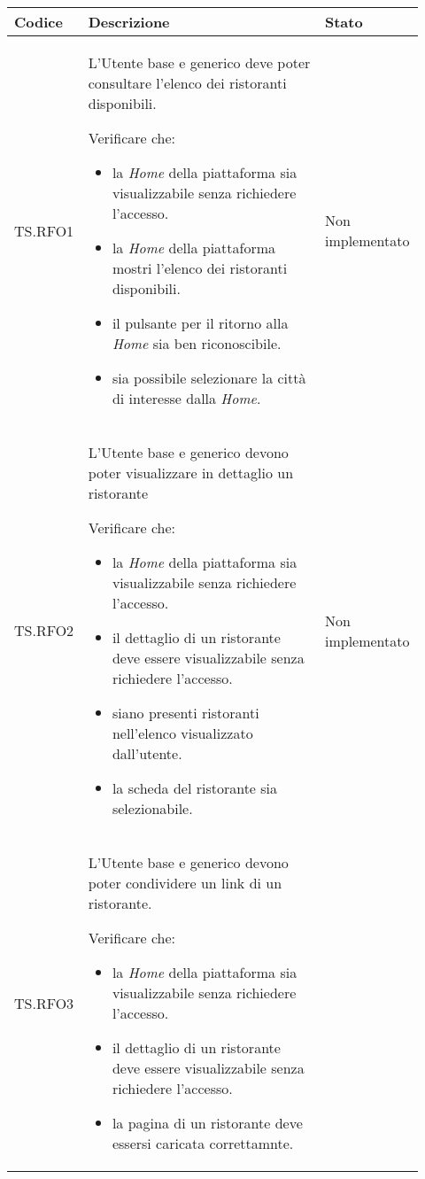 \fontsize{10}{12}\selectfont
\begin{longtable}{|p{0.12\linewidth}|p{0.58\linewidth}|p{0.22\linewidth}|}
    \hline
	\textbf{Codice} & \textbf{Descrizione} & \textbf{Stato} \\
    \hline
    TS.RFO1 & 
    L'Utente base e generico deve poter consultare l'elenco dei ristoranti disponibili. \par 
    Verificare che: 
    \begin{itemize}
        \item la \textit{Home} della piattaforma sia visualizzabile senza richiedere l'accesso.
        \item la \textit{Home} della piattaforma mostri l'elenco dei ristoranti disponibili.
        \item il pulsante per il ritorno alla \textit{Home} sia ben riconoscibile.
        \item sia possibile selezionare la città di interesse dalla \textit{Home}.
    \end{itemize}&
    Non implementato \\
    \hline
    TS.RFO2 & 
    L'Utente base e generico devono poter visualizzare in dettaglio un ristorante \par 
    Verificare che: 
    \begin{itemize}
        \item la \textit{Home} della piattaforma sia visualizzabile senza richiedere l'accesso.
        \item il dettaglio di un ristorante deve essere visualizzabile senza richiedere l'accesso.
        \item siano presenti ristoranti nell'elenco visualizzato dall'utente.
        \item la scheda del ristorante sia selezionabile.
    \end{itemize}&
    Non implementato \\
    \hline
    TS.RFO3 & 
    L'Utente base e generico devono poter condividere un link di un ristorante. \par 
    Verificare che: 
    \begin{itemize}
        \item la \textit{Home} della piattaforma sia visualizzabile senza richiedere l'accesso.
        \item il dettaglio di un ristorante deve essere visualizzabile senza richiedere l'accesso.
        \item la pagina di un ristorante deve essersi caricata correttamnte.

\end{itemize}
\end{longtable}
